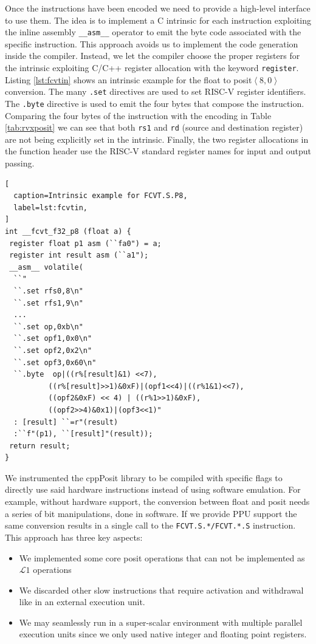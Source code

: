 Once the instructions have been encoded we need to provide a high-level interface to use them. The idea is to implement a C intrinsic for each instruction exploiting the inline assembly \texttt{\_\_asm\_\_} operator to emit the byte code associated with the specific instruction.
This approach avoids us to implement the code generation inside the compiler. Instead, we let the compiler choose the proper registers for the intrinsic exploiting C/C++ register allocation with the keyword \texttt{register}.
Listing \ref{lst:fcvtin} shows an intrinsic example for the float to posit$\left<8,0\right>$ conversion. The many \texttt{.set} directives are used to set RISC-V register identifiers. The \texttt{.byte} directive is used to emit the four bytes that compose the instruction. Comparing the four bytes of the instruction with the encoding in Table \ref{tab:rvxposit} we can see that both \texttt{rs1} and \texttt{rd} (source and destination register) are not being explicitly set in the intrinsic. Finally, the two register allocations in the function header use the RISC-V standard register names for input and output passing.
\vspace{1em}
\begin{lstlisting}[
  caption=Intrinsic example for FCVT.S.P8,
  label=lst:fcvtin,
]
int __fcvt_f32_p8 (float a) {
 register float p1 asm (``fa0") = a;
 register int result asm (``a1");
 __asm__ volatile(
  ``"
  ``.set rfs0,8\n"
  ``.set rfs1,9\n"
  ...
  ``.set op,0xb\n"
  ``.set opf1,0x0\n"
  ``.set opf2,0x2\n"
  ``.set opf3,0x60\n"
  ``.byte  op|((r%[result]&1) <<7),
          ((r%[result]>>1)&0xF)|(opf1<<4)|((r%1&1)<<7),
          ((opf2&0xF) << 4) | ((r%1>>1)&0xF),
          ((opf2>>4)&0x1)|(opf3<<1)"
  : [result] ``=r"(result)
  :``f"(p1), ``[result]"(result));
 return result;
}
\end{lstlisting}
We instrumented the cppPosit library to be compiled with specific flags to directly use said hardware instructions instead of using software emulation. For example, without hardware support, the conversion between float and posit needs a series of bit manipulations, done in software. If we provide PPU support the same conversion results in a single call to the \texttt{FCVT.S.*/FCVT.*.S} instruction. 
This approach has three key aspects:
\begin{itemize}
    \item We implemented some core posit operations that can not be implemented as $\mathcal{L}1$ operations
    \item We discarded other slow instructions that require activation and withdrawal like in an external execution unit.
    \item We may seamlessly run in a super-scalar environment with multiple parallel execution units since we only used native integer and floating point registers.
\end{itemize}
